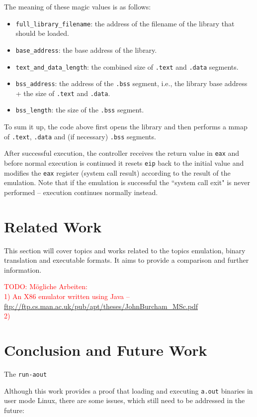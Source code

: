 \documentclass{article}
\newcommand{\todo}[1]{\textcolor{red}{TODO: #1}}
\begin{document}
The meaning of these magic values is as follows:
\begin{itemize}
    \item \texttt{full\_library\_filename}: the address of the filename of the library that should be loaded.
    \item \texttt{base\_address}: the base address of the library.
    \item \texttt{text\_and\_data\_length}: the combined size of \texttt{.text} and \texttt{.data} segments.
    \item \texttt{bss\_address}: the address of the \texttt{.bss} segment, i.e., the library base address + the size of \texttt{.text} and \texttt{.data}.
    \item \texttt{bss\_length}: the size of the \texttt{.bss} segment.
\end{itemize}

To sum it up, the code above first opens the library and then performs a mmap of \texttt{.text}, \texttt{.data} and (if necessary) \texttt{.bss} segments.

After successful execution, the controller receives the return value in \texttt{eax} and before normal execution is continued it resets \texttt{eip} back to the initial value and modifies the \texttt{eax} register (system call result) according to the result of the emulation. Note that if the emulation is successful the ``system call exit" is never performed -- execution continues normally instead.

\section{Related Work}

This section will cover topics and works related to the topics emulation, binary translation and executable formats. It aims to provide a comparison and further information.



\todo{Mögliche Arbeiten: \\
1) An X86 emulator written using Java -- \url{ftp://ftp.cs.man.ac.uk/pub/apt/theses/JohnBurcham\_MSc.pdf}\\
2) }

\section{Conclusion and Future Work}

The \texttt{run-aout} 

Although this work provides a proof that loading and executing \texttt{a.out} binaries in user mode Linux, there are some issues, which still need to be addressed in the future:
\end{document}
